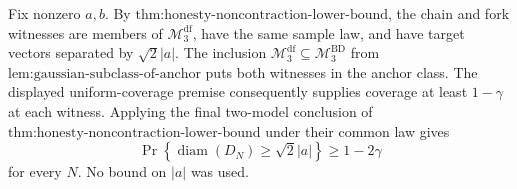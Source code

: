 Fix nonzero \(a,b\).  By \(\text{thm:honesty-noncontraction-lower-bound}\), the chain and fork witnesses are members of \(\mathcal M_3^{\mathrm{df}}\), have the same sample law, and have target vectors separated by \(\sqrt2|a|\).  The inclusion \(\mathcal M_3^{\mathrm{df}}\subseteq\mathcal M_3^{\mathrm{BD}}\) from \(\text{lem:gaussian-subclass-of-anchor}\) puts both witnesses in the anchor class.  The displayed uniform-coverage premise consequently supplies coverage at least \(1-\gamma\) at each witness.  Applying the final two-model conclusion of \(\text{thm:honesty-noncontraction-lower-bound}\) under their common law gives
\[
 \Pr\!\left\{\operatorname{diam}(D_N)\ge\sqrt2|a|\right\}\ge1-2\gamma
\]
for every \(N\).  No bound on \(|a|\) was used.